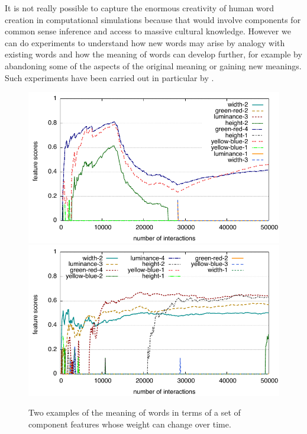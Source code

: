 \enlargethispage{1\baselineskip}
It is not really possible to capture the enormous creativity of human word creation in computational simulations 
because that would involve components for common sense inference and access to massive cultural knowledge. 
However we can do experiments to understand how new words may arise by analogy with existing words 
and how the meaning of words can develop further, for example by abandoning some of the aspects of 
the original meaning or gaining new meanings. Such experiments have 
been carried out in particular by \cite{Wellens:2008}. 


\begin{figure}
\begin{center}
\includegraphics[width=\textwidth]{chap12/figs/attribute-scores-4.pdf}
\includegraphics[width=\textwidth]{chap12/figs/dog-meaning.pdf}
\end{center}
\caption{Two examples of the meaning of words in terms of a set of component features whose weight can change over time.}
\label{fig:weightchange}
\end{figure}

